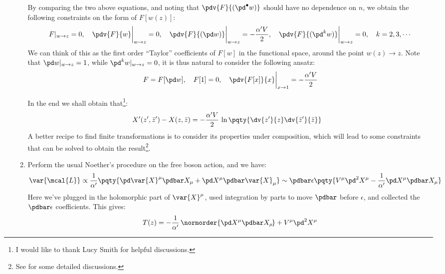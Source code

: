 \documentclass[a4paper,10pt]{article}
\begin{document}
\begin{enumerate}
\begin{enumerate}
	By comparing the two above equations, and noting that $\pdv{F}{(\pd^\bullet w)}$ should have no dependence on $n$, we obtain the following constraints on the form of $F[w(z)]$:
	\begin{equation}
		F|_{w\to z} = 0,
	\quad
		\pdv{F}{w}\bigg|_{w\to z} = 0,
	\quad
		\pdv{F}{(\pd w)}\bigg|_{w\to z}
		= -\frac{\alpha' V}{2},
	\quad
		\pdv{F}{(\pd^k w)}\bigg|_{w\to z} = 0,
	\quad k = 2,3,\cdots
	\end{equation}
	We can think of this as the first order ``Taylor'' coefficients of $F[w]$ in the functional space, around the point $w(z) \to z$. Note that $\pd w|_{w\to z} = 1$, while $
		\pd^k w|_{w\to z} = 0
	$, it is thus natural to consider the following ansatz:
	\begin{equation}
		F = F[\pd w],
	\quad
		F[1] = 0,
	\quad
		\pdv{F[x]}{x}\bigg|_{x\to 1}
		= -\frac{\alpha' V}{2}
	\end{equation}
	
	In the end we shall obtain that\footnote{
		I would like to thank Lucy Smith for helpful discussions. 
	}:
	\begin{equation}
	\begin{aligned}
		X'(z',\bar{z}') - X(z,\bar{z})
		&= -\frac{\alpha' V}{2}\,
			\ln \pqty{
				\dv{z'}{z}
				\dv{\bar{z}'}{\bar{z}}
			}
	\end{aligned}
	\end{equation}
	A better recipe to find finite transformations is to consider its properties under composition, which will lead to some constraints that can be solved to obtain the result\footnote{
		See  for some detailed discussions.
	}. 
	
	\item Perform the usual Noether's procedure on the free boson action, and we have:
	\begin{equation}
		\var{\mcal{L}}
		\propto \frac{1}{\alpha'} \pqty{
				\pd \var{X}^\mu \pdbar X_\mu
				+ \pd X^\mu \pdbar \var{X}_\mu
			}
		\sim \pdbar \epsilon \pqty{
			V^\mu \pd^2 X^\mu
			- \frac{1}{\alpha'}
				\pd X^\mu \pdbar X_\mu
		}
	\end{equation}
	Here we've plugged in the holomorphic part of $\var{X}^\mu$, used integration by parts to move $\pdbar$ before $\epsilon$, and collected the $\pdbar\epsilon$ coefficients. This gives:
	\begin{equation}
		T(z) = - \frac{1}{\alpha'}\,\normorder{
				\pd X^\mu \pdbar X_\mu\!
			} + V^\mu \pd^2 X^\mu
	\end{equation}
\pagebreak[3]
	

\end{enumerate}
\end{enumerate}
\end{document}
